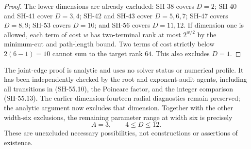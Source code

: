\begin{proof}
The lower dimensions are already excluded: SH-38
covers $D=2$; SH-40 and SH-41 cover $D=3,4$;
SH-42 and SH-43 cover $D=5,6,7$; SH-47 covers
$D=8,9$; SH-53 covers $D=10$; and SH-56 covers
$D=11,12$.  If dimension one is allowed, each term
of cost $w$ has two-terminal rank at most
$2^{w/2}$ by the minimum-cut and path-length bound.
Two terms of cost strictly below $2(6-1)=10$
cannot sum to the target rank $64$.  This also
excludes $D=1$.
\end{proof}

The joint-edge proof is analytic and uses no solver
status or numerical profile.  It has been independently
checked by the root and exponent-audit agents, including
all transitions in (SH-55.10), the Poincare factor,
and the integer comparison (SH-55.13).  The earlier
dimension-fourteen radial diagnostics remain preserved;
the analytic argument now excludes that dimension.
Together with the other width-six exclusions, the
remaining parameter range at width six is precisely
\[
                        A=3,\qquad4\leq D\leq12.
\]
These are unexcluded necessary possibilities, not
constructions or assertions of existence.

